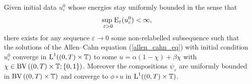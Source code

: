 \begin{proposition}
	\label{initial_convergence_result}
	Given initial data $ u_{ \varepsilon }^{ 0 } $ whose energies stay uniformly bounded in the sense that
	\begin{equation}
		\sup_{ \ \varepsilon > 0 }
		\operatorname{E}_{ \varepsilon } ( u_{ \varepsilon }^{ 0 } ) 
		< 
		\infty,
	\end{equation}
	there exists for any sequence $ \varepsilon \to 0 $ some non-relabelled subsequence such that the solutions of the Allen--Cahn equation (\ref{allen_cahn_eq}) with initial condition $ u_{ \varepsilon }^{ 0 } $ converge in $ \operatorname{L}^{ 1 } ( ( 0, T ) \times \operatorname{\mathbb{T}} ) $ to some $ u = \alpha ( 1 - \chi ) + \beta \chi $ with $ \chi \in \operatorname{BV} \left( ( 0 , T ) \times \operatorname{\mathbb{T}} ; \{ 0 , 1 \} \right) $. Moreover the compositions $ \psi_{ \varepsilon } $ are uniformly bounded in $ \operatorname{BV} \left( ( 0, T ) \times \operatorname{\mathbb{T}} \right) $ and converge to $ \phi \circ u $ in $ \operatorname{L}^{ 1 } ( ( 0 , T ) \times \operatorname{\mathbb{T}} ) $.
\end{proposition}

